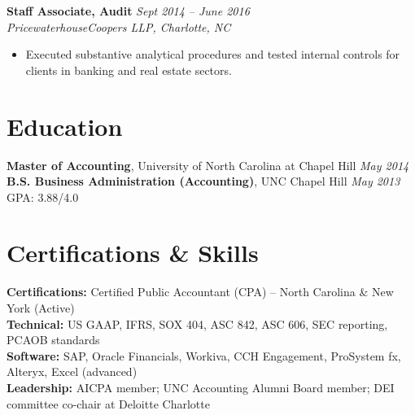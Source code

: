 \documentclass[11pt,a4paper]{article}
\begin{document}
\vspace{4pt}
\noindent\textbf{Staff Associate, Audit} \hfill \textit{Sept 2014 -- June 2016}\\
\textit{PricewaterhouseCoopers LLP, Charlotte, NC}
\begin{itemize}
  \item Executed substantive analytical procedures and tested internal controls for clients in banking and real estate sectors.
\end{itemize}

\section{Education}
\textbf{Master of Accounting}, University of North Carolina at Chapel Hill \hfill \textit{May 2014}\\
\textbf{B.S. Business Administration (Accounting)}, UNC Chapel Hill \hfill \textit{May 2013} \quad GPA: 3.88/4.0

\section{Certifications \& Skills}
\textbf{Certifications:} Certified Public Accountant (CPA) -- North Carolina \& New York (Active)\\
\textbf{Technical:} US GAAP, IFRS, SOX 404, ASC 842, ASC 606, SEC reporting, PCAOB standards\\
\textbf{Software:} SAP, Oracle Financials, Workiva, CCH Engagement, ProSystem fx, Alteryx, Excel (advanced)\\
\textbf{Leadership:} AICPA member; UNC Accounting Alumni Board member; DEI committee co-chair at Deloitte Charlotte
\end{document}
